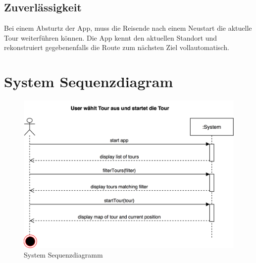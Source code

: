 \documentclass[a4paper,10pt,xetex]{article}
\begin{document}
\subsection{Zuverlässigkeit}\label{zuverluxe4ssigkeit}
Bei einem Absturtz der App, muss die Reisende nach einem Neustart die
aktuelle Tour weiterführen können. Die App kennt den aktuellen Standort
und rekonstruiert gegebenenfalls die Route zum nächsten Ziel
vollautomatisch.


\section{System Sequenzdiagram}\label{systemsequenzdiagram}

\begin{figure}
\centering
\includegraphics{UC1_SystemSequenzDiagram}
\caption{System Sequenzdiagramm}
\end{figure}
\end{document}
